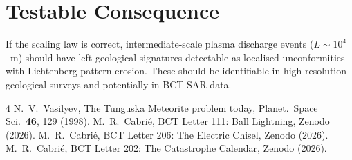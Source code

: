 \documentclass[aps,prl,twocolumn,superscriptaddress]{revtex4-2}
\begin{document}
\section{Testable Consequence}

If the scaling law is correct, intermediate-scale plasma discharge events ($L \sim 10^4$~m) should have left geological signatures detectable as localised unconformities with Lichtenberg-pattern erosion. These should be identifiable in high-resolution geological surveys and potentially in BCT SAR data.

\begin{thebibliography}{4}
 N.~V.~Vasilyev, The Tunguska Meteorite problem today, Planet.\ Space Sci.\ \textbf{46}, 129 (1998).
 M.~R.~Cabri\'e, BCT Letter 111: Ball Lightning, Zenodo (2026).
 M.~R.~Cabri\'e, BCT Letter 206: The Electric Chisel, Zenodo (2026).
 M.~R.~Cabri\'e, BCT Letter 202: The Catastrophe Calendar, Zenodo (2026).
\end{thebibliography}
\end{document}
